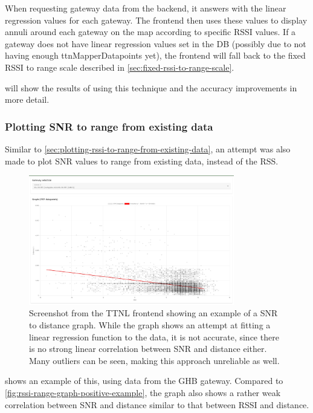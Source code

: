 When requesting gateway data from the backend, it answers with the linear regression values for each gateway.
The frontend then uses these values to display annuli around each gateway on the map according to specific \ac{RSSI} values.
If a gateway does not have linear regression values set in the \ac{DB} (possibly due to not having enough ttnMapperDatapoints yet), the frontend will fall back to the fixed \ac{RSSI} to range scale described in \cref{sec:fixed-rssi-to-range-scale}.

 will show the results of using this technique and the accuracy improvements in more detail.

\subsubsection{Plotting \acs{SNR} to range from existing data}\label{sec:plotting-snr-to-range-from-existing-data}

Similar to \cref{sec:plotting-rssi-to-range-from-existing-data}, an attempt was also made to plot \ac{SNR} values to range from existing data, instead of the \ac{RSS}.

\begin{figure}[htbp]
    \centering
    \includegraphics[width=0.8\textwidth]{pictures/ttn-locator/frontend/data/gateway_ghb_snr_range_graph.jpg}
    \caption{
        Screenshot from the \ac{TTNL} frontend showing an example of a \acf{SNR} to distance graph.
        While the graph shows an attempt at fitting a linear regression function to the data, it is not accurate, since there is no strong linear correlation between \ac{SNR} and distance either.
        Many outliers can be seen, making this approach unreliable as well.
    }\label{fig:snr-range-graph-example}
\end{figure}

 shows an example of this, using data from the \ac{GHB} gateway.
Compared to \cref{fig:rssi-range-graph-positive-example}, the graph also shows a rather weak correlation between \ac{SNR} and distance similar to that between \ac{RSSI} and distance.

